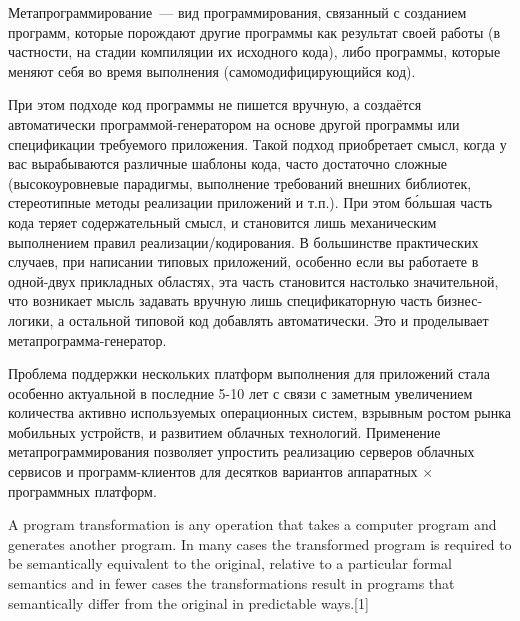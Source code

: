 \secdown

Метапрограммирование\ --- вид программирования, связанный с созданием программ,
которые порождают другие программы как результат своей работы (в частности, на
стадии компиляции их исходного кода), либо программы, которые меняют себя во
время выполнения (самомодифицирующийся код).


При этом подходе код программы не пишется вручную, а создаётся автоматически
программой-генератором на основе другой программы или спецификации требуемого
приложения. Такой подход приобретает смысл, когда у вас вырабываются различные
шаблоны кода, часто достаточно сложные (высокоуровневые парадигмы, выполнение
требований внешних библиотек, стереотипные методы реализации приложений и т.п.).
При этом б\'{о}льшая часть кода теряет содержательный смысл, и становится лишь
механическим выполнением правил реализации/кодирования. В большинстве
практических случаев, при написании типовых приложений, особенно если вы
работаете в одной-двух прикладных областях, эта часть становится настолько
значительной, что возникает мысль задавать вручную лишь спецификаторную часть
бизнес-логики, а остальной типовой код добавлять автоматически. Это и
проделывает метапрограмма-генератор.


Проблема поддержки нескольких платформ выполнения для приложений стала особенно
актуальной в последние 5-10 лет с связи с заметным увеличением количества
активно используемых операционных систем, взрывным ростом рынка мобильных
устройств, и развитием облачных технологий. Применение метапрограммирования
позволяет упростить реализацию серверов облачных сервисов и программ-клиентов
для десятков вариантов аппаратных $\times$ программных платформ.


A program transformation is any operation that takes a computer program and
generates another program. In many cases the transformed program is required to
be semantically equivalent to the original, relative to a particular formal
semantics and in fewer cases the transformations result in programs that
semantically differ from the original in predictable ways.[1]

